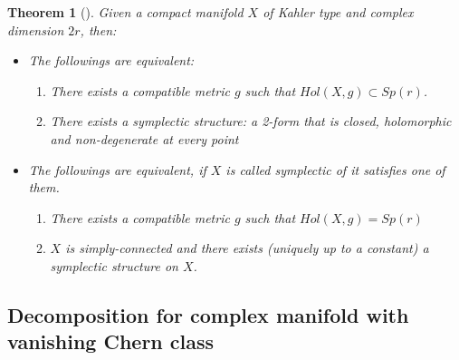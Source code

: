 \documentclass[11pt]{article}
\newtheorem{theorem}{Theorem}
\begin{document}
\begin{theorem}[]
Given a compact manifold \(X\) of Kahler type and complex dimension \(2r\), then:
\begin{itemize}
\item The followings are equivalent:
\begin{enumerate}
\item There exists a compatible metric \(g\) such that \(Hol(X,g) \subset Sp(r)\).
\item There exists a symplectic structure: a 2-form that is closed, holomorphic and non-degenerate
at every point
\end{enumerate}
\item The followings are equivalent, if \(X\) is called symplectic of it satisfies one of them.
\begin{enumerate}
\item There exists a compatible metric \(g\) such that \(Hol(X,g) = Sp(r)\)
\item \(X\) is simply-connected and there exists (uniquely up to a constant) a symplectic structure on \(X\).
\end{enumerate}
\end{itemize}
\end{theorem}

\subsection{Decomposition for complex manifold with vanishing Chern class}
\label{sec:org2d435d3}
\end{document}
